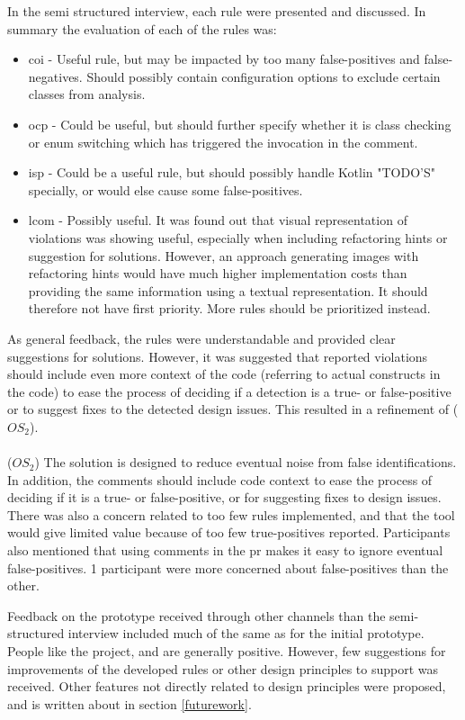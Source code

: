 \documentclass[pdftex,10pt,b5paper,twoside]{report}
\begin{document}
In the semi structured interview, each rule were presented and discussed. In summary the evaluation of each of the rules was:
\begin{itemize}
    \item \gls{coi} - Useful rule, but may be impacted by too many false-positives and false-negatives. Should possibly contain configuration options to exclude certain classes from analysis.
\item \gls{ocp} - Could be useful, but should further specify whether it is class checking or enum switching which has triggered the invocation in the comment. 
\item \gls{isp} - Could be a useful rule, but should possibly handle Kotlin "TODO'S" specially, or would else cause some false-positives.
\item \gls{lcom} - Possibly useful. It was found out that visual representation of violations was showing useful, especially when including refactoring hints or suggestion for solutions. However, an approach generating images with refactoring hints would have much higher implementation costs than providing the same information using a textual representation. It should therefore not have first priority. More rules should be prioritized instead.
\end{itemize}

As general feedback, the rules were understandable and provided clear suggestions for solutions. However, it was suggested that reported violations should include even more context of the code (referring to actual constructs in the code) to ease the process of deciding if a detection is a true- or false-positive or to suggest fixes to the detected design issues. This resulted in a refinement of (\(OS_{2}\)). \\\\(\(OS_{2}\)) The solution is designed to reduce eventual noise from false identifications. In addition, the comments should include code context to ease the process of deciding if it is a true- or false-positive, or for suggesting fixes to design issues. \\

There was also a concern related to too few rules implemented, and that the tool would give limited value because of too few true-positives reported. Participants also mentioned that using comments in the \gls{pr} makes it easy to ignore eventual false-positives. 1 participant were more concerned about false-positives than the other.

Feedback on the prototype received through other channels than the semi-structured interview included much of the same as for the initial prototype. People like the project, and are generally positive. However, few suggestions for improvements of the developed rules or other design principles to support was received. Other features not directly related to design principles were proposed, and is written about in section \ref{futurework}.
\end{document}
